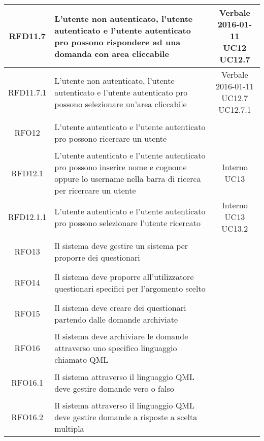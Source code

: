 \begin{longtable}{|c|>{\centering}m{7cm}|c|}
			 \hypertarget{{RFD11.7}}{{RFD11.7}} & L’utente non autenticato, l’utente autenticato e l’utente autenticato pro possono rispondere ad una domanda con area cliccabile & \makecell{Verbale 2016-01-11\\ UC12 \\UC12.7 } \\ \hline
			 \hypertarget{{RFD11.7.1}}{{RFD11.7.1}} & L’utente non autenticato, l’utente autenticato e l’utente autenticato pro possono selezionare un’area cliccabile & \makecell{Verbale 2016-01-11\\ UC12.7 \\UC12.7.1 } \\ \hline
			 \hypertarget{{RFO12}}{{RFO12}} & L’utente autenticato e l’utente autenticato pro possono ricercare un utente & \makecell{Interno } \\ \hline
			 \hypertarget{{RFD12.1}}{{RFD12.1}} & L’utente autenticato e l’utente autenticato pro possono inserire nome e cognome oppure lo username nella barra di ricerca per ricercare un utente & \makecell{Interno\\ UC13 } \\ \hline
			 \hypertarget{{RFD12.1.1}}{{RFD12.1.1}} &  L’utente autenticato e l’utente autenticato pro possono selezionare l’utente ricercato & \makecell{Interno\\ UC13 \\UC13.2 } \\ \hline
			 \hypertarget{{RFO13}}{{RFO13}} & Il sistema deve gestire un sistema per proporre dei questionari & \makecell{Capitolato } \\ \hline
			 \hypertarget{{RFO14}}{{RFO14}} & Il sistema deve proporre all’utilizzatore questionari specifici per l’argomento scelto & \makecell{Capitolato } \\ \hline
			 \hypertarget{{RFO15}}{{RFO15}} & Il sistema deve creare dei questionari partendo dalle domande archiviate & \makecell{Capitolato } \\ \hline
			 \hypertarget{{RFO16}}{{RFO16}} & Il sistema deve archiviare le domande attraverso uno specifico linguaggio chiamato QML & \makecell{Capitolato } \\ \hline
			 \hypertarget{{RFO16.1}}{{RFO16.1}} & Il sistema attraverso il linguaggio QML deve gestire domande vero o falso & \makecell{Capitolato } \\ \hline
			 \hypertarget{{RFO16.2}}{{RFO16.2}} & Il sistema attraverso il linguaggio QML deve gestire domande a risposte a scelta multipla & \makecell{Capitolato } \\ \hline

\end{longtable}

